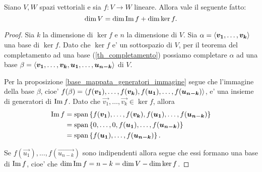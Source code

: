 \begin{theorem} 
     \label{th_dimensioni}
    Siano $V, W$ spazi vettoriali e sia $f : V \to W$ lineare. Allora vale il seguente fatto:
    \begin{equation}
        \dim V = \dim \operatorname{Im}f + \dim \ker f.
    \end{equation}
\end{theorem}
\begin{proof}
    Sia $k$ la dimensione di $\ker f$ e $n$ la dimensione di $V$.
    Sia $\alpha = \left\langle \bm{v_1}, \dots, \bm{v_k} \right\rangle$ una base di $\ker f$. Dato che $\ker f$ e' un sottospazio di $V$, per il teorema del completamento ad una base (\ref{th_completamento}) possiamo completare $\alpha$ ad una base $\beta = \left\langle \bm{v_1}, \dots, \bm{v_k}, \bm{u_1}, \dots, \bm{u_{n-k}} \right\rangle$ di $V$.

    Per la proposizione \ref{base_mappata_generatori_immagine} segue che l'immagine della base $\beta$, cioe' $f(\beta) = \left\langle f(\bm{v_1}), \dots, f(\bm{v_k}), f(\bm{u_1}), \dots, f(\bm{u_{n-k}}) \right\rangle$, e' una insieme di generatori di $\operatorname{Im}f$. Dato che $\vec{v_1}, \dots, \vec{v_k} \in \ker f$, allora \begin{alignat*}
        {1}
        \operatorname{Im}f &= \operatorname{span}\left\{f(\bm{v_1}), \dots, f(\bm{v_k}), f(\bm{u_1}), \dots, f(\bm{u_{n-k}})\right\}\\
        &= \operatorname{span}\left\{0, \dots, 0, f(\bm{u_1}), \dots, f(\bm{u_{n-k}})\right\}\\
        &= \operatorname{span}\left\{f(\bm{u_1}), \dots, f(\bm{u_{n-k}})\right\}.
    \end{alignat*}

    Se $f(\vec{u_1}), \dots, f(\vec{u_{n-k}})$ sono indipendenti allora segue che essi formano una base di $\operatorname{Im}f$, cioe' che $\dim \operatorname{Im}f = n - k = \dim V - \dim \ker f$.


\end{proof}
